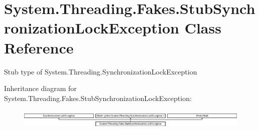 \hypertarget{class_system_1_1_threading_1_1_fakes_1_1_stub_synchronization_lock_exception}{\section{System.\-Threading.\-Fakes.\-Stub\-Synchronization\-Lock\-Exception Class Reference}
\label{class_system_1_1_threading_1_1_fakes_1_1_stub_synchronization_lock_exception}
}


Stub type of System.\-Threading.\-Synchronization\-Lock\-Exception 


Inheritance diagram for System.\-Threading.\-Fakes.\-Stub\-Synchronization\-Lock\-Exception\-:\begin{figure}[H]
\begin{center}
\leavevmode
\includegraphics[height=0.962199cm]{class_system_1_1_threading_1_1_fakes_1_1_stub_synchronization_lock_exception}
\end{center}
\end{figure}
